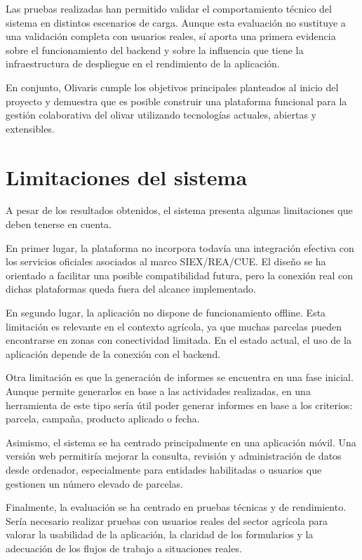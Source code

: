 Las pruebas realizadas han permitido validar el comportamiento técnico del sistema en distintos escenarios de carga. Aunque esta evaluación no sustituye a una validación completa con usuarios reales, sí 
aporta una primera evidencia sobre el funcionamiento del backend y sobre la influencia que tiene la infraestructura de despliegue en el rendimiento de la aplicación.

En conjunto, Olivaris cumple los objetivos principales planteados al inicio del proyecto y demuestra que es posible construir una plataforma funcional para la gestión colaborativa del olivar utilizando 
tecnologías actuales, abiertas y extensibles.

\section{Limitaciones del sistema}

A pesar de los resultados obtenidos, el sistema presenta algunas limitaciones que deben tenerse en cuenta.

En primer lugar, la plataforma no incorpora todavía una integración efectiva con los servicios oficiales asociados al marco SIEX/REA/CUE. El diseño se ha orientado a facilitar una posible compatibilidad 
futura, pero la conexión real con dichas plataformas queda fuera del alcance implementado.

En segundo lugar, la aplicación no dispone de funcionamiento offline. Esta limitación es relevante en el contexto agrícola, ya que muchas parcelas pueden encontrarse en zonas con conectividad limitada. 
En el estado actual, el uso de la aplicación depende de la conexión con el backend.

Otra limitación es que la generación de informes se encuentra en una fase inicial. Aunque permite generarlos en base a las actividades realizadas, en una herramienta de este tipo sería útil poder generar 
informes en base a los criterios: parcela, campaña, producto aplicado o fecha.

Asimismo, el sistema se ha centrado principalmente en una aplicación móvil. Una versión web permitiría mejorar la consulta, revisión y administración de datos desde ordenador, especialmente para entidades 
habilitadas o usuarios que gestionen un número elevado de parcelas.

Finalmente, la evaluación se ha centrado en pruebas técnicas y de rendimiento. Sería necesario realizar pruebas con usuarios reales del sector agrícola para valorar la usabilidad de la aplicación, la claridad 
de los formularios y la adecuación de los flujos de trabajo a situaciones reales.

